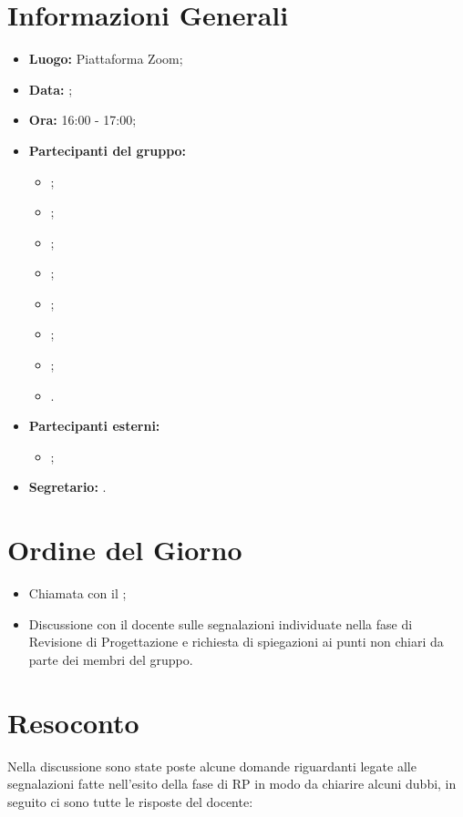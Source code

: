 \section{Informazioni Generali}
\begin{itemize}
\item \textbf{Luogo:} Piattaforma Zoom;
\item \textbf{Data:} \Data;
\item \textbf{Ora:} 16:00 - 17:00;
\item \textbf{Partecipanti del gruppo:}
	\begin{itemize}
	\item \AT{}; 
	\item \CE{}; 
	\item \DF{};
	\item \LD{};
	\item \PF{};
	\item \SE{};
	\item \BR{};
	\item \MC{}.
	\end{itemize} 
\item \textbf{Partecipanti esterni:}
\begin{itemize}
	\item \VT{};
\end{itemize} 

\item \textbf{Segretario:} \PF{}.

\end{itemize}


\section{Ordine del Giorno}
\begin{itemize}
	\item Chiamata con il \VT{};
	\item Discussione con il docente sulle segnalazioni individuate nella fase di Revisione di Progettazione e richiesta di spiegazioni ai punti non chiari da parte dei membri del gruppo.
\end{itemize}

\section{Resoconto}
Nella discussione sono state poste alcune domande riguardanti legate alle segnalazioni fatte nell'esito della fase di RP in modo da chiarire alcuni dubbi, in seguito ci sono tutte le risposte del docente:

